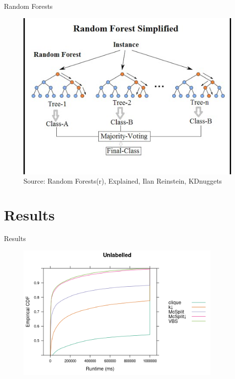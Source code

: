 \documentclass{beamer}
\begin{document}
\begin{frame}{Random Forests \parencite{DBLP:journals/ml/Breiman01}}
  \begin{figure}
    \centering
    \includegraphics[scale=0.5]{rand-forest-1.jpg} \\
    {\tiny\color{gray}Source: Random Forests(r), Explained, Ilan Reinstein, KDnuggets}
  \end{figure}
\end{frame}

\section{Results}

\begin{frame}{Results}
  \begin{figure}
    \centering
    \includegraphics[width=0.9\textwidth]{../dissertation/images/ecdf_unlabelled.png}
  \end{figure}
\end{frame}
\end{document}
